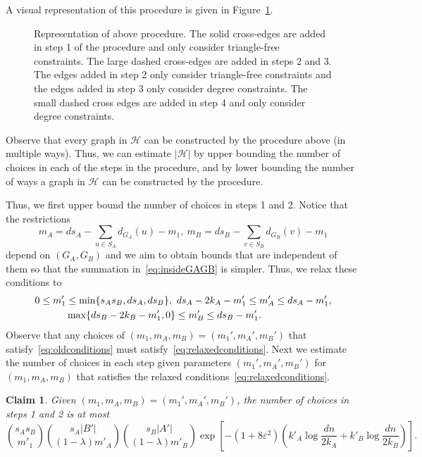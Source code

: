 \documentclass[11pt]{article}
\theoremstyle{plain}
\newtheorem{claim}{Claim}[thm]
\begin{document}
    A visual representation of this procedure is given in Figure~\ref{fig: large torso}.

    \begin{figure}[h]
        \centering{
        \resizebox{0.8\textwidth}{!}{\fontsize{30pt}{30pt}\selectfont%
        }}
        \label{fig: large torso}
        \caption[Procedure for constructing graphs in \cref{lem: Janson Counting 1}]{Representation of above procedure. The solid cross-edges are added in step 1 of the procedure and only consider triangle-free constraints. The large dashed cross-edges are added in steps 2 and 3. The edges added in step 2 only consider triangle-free constraints and the edges added in step 3 only consider degree constraints. The small dashed cross edges are added in step 4 and only consider degree constraints.}
\end{figure}

Observe that every graph in ${\mathcal H}$ can be constructed by the procedure above (in multiple ways). Thus, we can estimate $|{\mathcal H}|$ by upper bounding the number of choices in each of the steps in the procedure, and by lower bounding the number of ways a graph in ${\mathcal H}$ can be constructed by the procedure.


Thus, we first upper bound the number of choices in steps 1 and 2. Notice that the restrictions 
\begin{equation}
m_A = ds_A  - \sum_{u \in S_A}d_{G_A}(u) - m_1,\ m_B= ds_B -  \sum_{v \in S_B}d_{G_B}(v)- m_1
\label{eq:oldconditions}
\end{equation}
depend on $(G_A,G_B)$ and we aim to obtain bounds that are independent of them so that the summation in~\eqref{eq:insideGAGB} is simpler. Thus, we relax these conditions to 
\begin{align}
    0 \leq m'_1 &\leq \min\{s_As_B, ds_A,ds_B\},\  ds_A - 2k_A-m'_1 \leq m'_A \leq ds_A - m'_1,\notag\\
    &\max\{ds_B - 2k_B - m_1', 0\} \leq m'_B \leq ds_B - m_1'.\label{eq:relaxedconditions}
\end{align}
Observe that any choices of $(m_1,m_A,m_B)=(m_1',m_A',m_B')$ that satisfy~\eqref{eq:oldconditions} must satisfy~\eqref{eq:relaxedconditions}. Next we estimate the number of choices in each step given parameters $(m_1',m_A',m_B')$ for $(m_1,m_A,m_B)$ that satisfies the relaxed conditions~\eqref{eq:relaxedconditions}.

\begin{claim}\label{clm: janson 1 step 3}
Given $(m_1,m_A,m_B)=(m_1',m_A',m_B')$,
the number of choices in steps 1 and 2 is at most
\[
   \binom{s_As_B}{m'_1}{s_A|B'| \choose (1-\lambda )m'_A} {s_B|A'| \choose (1-\lambda )m'_B}\exp\left[-(1 + 8\varepsilon^2) \left(k'_A \log\frac{dn}{2k_A}+k'_B \log\frac{dn}{2k_B} \right)\right].
    \]
\end{claim}
\end{document}
